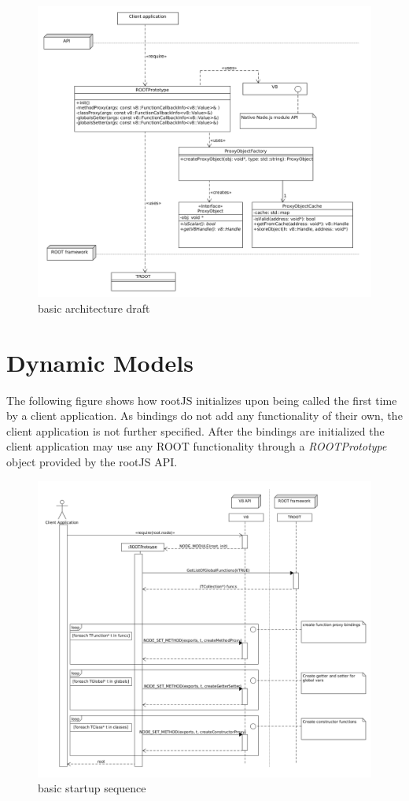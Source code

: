 \begin{figure}[htb]
	\centering
	\includegraphics[width=18cm]{./latex/resources/architecture.png}
	\caption{basic architecture draft}
\end{figure}


\section{Dynamic Models}
The following figure shows how rootJS initializes upon being called the first time by a client application. As bindings do not add any functionality of their own, the client application is not further specified. After the bindings are initialized the client application may use any ROOT functionality through a \textit{ROOTPrototype} object provided by the rootJS API.

\begin{figure}[htb]
	\centering
	\includegraphics[width=18cm]{./latex/resources/startupSequence.png}
	\caption{basic startup sequence}
\end{figure}

